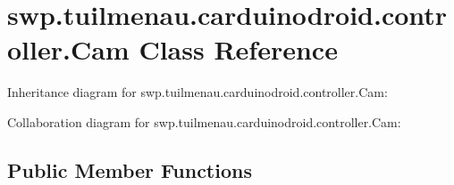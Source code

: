 \hypertarget{classswp_1_1tuilmenau_1_1carduinodroid_1_1controller_1_1_cam}{}\section{swp.\+tuilmenau.\+carduinodroid.\+controller.\+Cam Class Reference}
\label{classswp_1_1tuilmenau_1_1carduinodroid_1_1controller_1_1_cam}


Inheritance diagram for swp.\+tuilmenau.\+carduinodroid.\+controller.\+Cam\+:


Collaboration diagram for swp.\+tuilmenau.\+carduinodroid.\+controller.\+Cam\+:
\subsection*{Public Member Functions}

